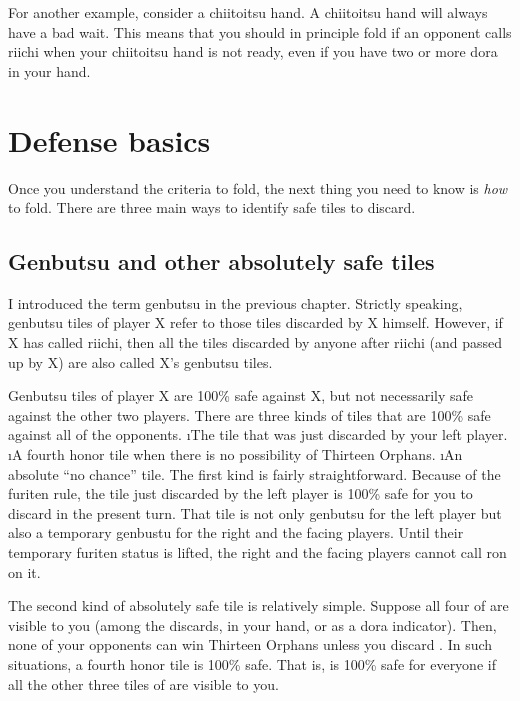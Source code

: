 \bigskip
For another example, consider a {\jap chiitoitsu} hand. A {\jap chiitoitsu} hand will always have a bad wait. This means that you should in principle fold if an opponent calls riichi when your {\jap chiitoitsu} hand is not ready, even if you have two or more {\jap dora} in your hand.

\section{Defense basics} \label{sec:defense}

Once you understand the criteria to fold, the next thing you need to know is \emph{how} to fold. There are three main ways to identify safe tiles to discard. 

\subsection{{\jap Genbutsu} and other absolutely safe tiles}  \label{sec:genbutsu_def}
I introduced the term {\jap genbutsu} in the previous chapter. Strictly speaking, {\jap genbutsu} tiles of player X refer to those tiles discarded by X himself. However, if X has called riichi, then all the tiles discarded by anyone after riichi (and passed up by X) are also called X's {\jap genbutsu} tiles. 

\bigskip
{\jap Genbutsu} tiles of player X are 100\% safe against X, but not necessarily safe against the other two players. There are three kinds of tiles that are 100\% safe against all of the opponents. 
\bi
\i The tile that was just discarded by your left player.
\i A fourth honor tile when there is no possibility of Thirteen Orphans.
\i An absolute ``no chance'' tile.
\ei
The first kind is fairly straightforward. Because of the {\jap furiten} rule, the tile just discarded by the left player is 100\% safe for you to discard in the present turn. That tile is not only {\jap genbutsu} for the left player but also a temporary {\jap genbustu} for the right and the facing players. Until their temporary {\jap furiten} status is lifted, the right and the facing players cannot call {\jap ron} on it. 

\bigskip
The second kind of absolutely safe tile is relatively simple. Suppose all four of {\LARGE{}} are visible to you (among the discards, in your hand, or as a {\jap dora} indicator). Then, none of your opponents can win Thirteen Orphans unless you discard {\LARGE{}}. In such situations, a fourth honor tile is 100\% safe. That is, {\LARGE\dong} is 100\% safe for everyone if all the other three tiles of {\LARGE\dong} are visible to you.

